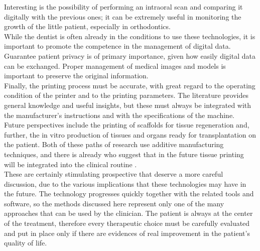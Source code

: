 Interesting is the possibility of performing an intraoral scan and comparing it digitally with the previous ones; it can be extremely useful in monitoring the growth of the little patient, especially in orthodontics. \\
While the dentist is often already in the conditions to use these technologies, it is important to promote the competence in the management of digital data. Guarantee patient privacy is of primary importance, given how easily digital data can be exchanged. Proper management of medical images and models is important to preserve the original information.\\ Finally, the printing process must be accurate, with great regard to the operating condition of the printer and to the printing parameters. The literature provides general knowledge and useful insights, but these must always be integrated with the manufacturer's instructions and with the specifications of the machine.\\
Future perspectives include the printing of scaffolds for tissue regeneration and, further, the in vitro production of tissues and organs ready for transplantation on the patient. Both of these paths of research use additive manufacturing techniques, and there is already who suggest that in the future tissue printing will be integrated into the clinical routine \parencite{Reference142}. \\
These are certainly stimulating prospective that deserve a more careful discussion, due to the various implications that these technologies may have in the future. The technology progresses quickly together with the related tools and software, so the methods discussed here represent only one of the many approaches that can be used by the clinician. The patient is always at the center of the treatment, therefore every therapeutic choice must be carefully evaluated and put in place only if there are evidences of real improvement in the patient's quality of life.
